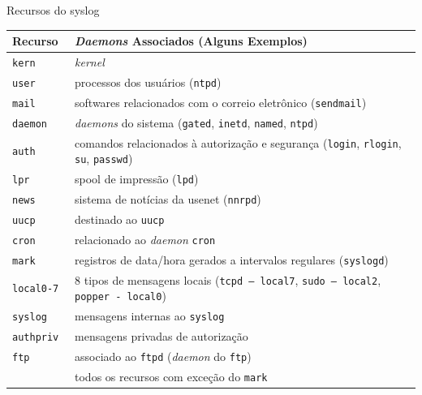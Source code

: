 \begin{quadro}[h!]
\begin{center}
  \caption{Recursos do {\ttfamily syslog}}
  \label{tab:outro}
  \begin{tabular}{|l|p{9cm}|}
    \hline
    \rowcolor[gray]{.9}
    \bf Recurso & \bf {\em Daemons} Associados (Alguns Exemplos) \\
    \hline
    \tt kern & \em kernel  \\
    \hline
    \tt user & processos dos usuários ({\tt ntpd}) \\
    \hline
    \tt mail & softwares relacionados com o correio eletrônico ({\tt sendmail})\\
    \hline
    \tt daemon & {\em daemons} do sistema ({\tt gated}, {\tt inetd}, 
    {\tt named}, {\tt ntpd})\\
    \hline
    \tt auth &  comandos relacionados à autorização e segurança 
    ({\tt login}, {\tt rlogin}, {\tt su}, {\tt passwd}) \\
    \hline
    \tt lpr & spool de impressão ({\tt lpd})\\
    \hline
    \tt news & sistema de notícias da usenet ({\tt nnrpd})\\
    \hline
    \tt uucp & destinado ao {\tt uucp}\\
    \hline
    \tt cron & relacionado ao {\em daemon} {\tt cron}\\
    \hline
    \tt mark &  registros de data/hora gerados a intervalos regulares 
    ({\tt syslogd})\\
    \hline
    \tt local0-7 & 8 tipos de mensagens locais ({\tt tcpd -- local7}, {\tt sudo -- local2}, {\tt popper - local0}) \\
    \hline
    \tt syslog &  mensagens internas ao {\tt syslog}\\
    \hline
    \tt authpriv & mensagens privadas de autorização\\
    \hline
    \tt ftp & associado ao {\tt ftpd} ({\em daemon} do {\tt ftp}) \\
    \hline
    \tt * &  todos os recursos com exceção do {\tt mark}\\
    \hline
  \end{tabular}
\end{center}
\end{quadro}

